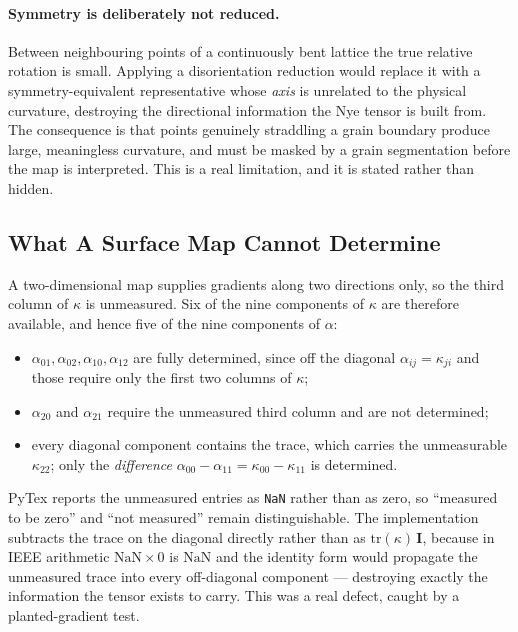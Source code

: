 \paragraph{Symmetry is deliberately not reduced.}
Between neighbouring points of a continuously bent lattice the true relative
rotation is small. Applying a disorientation reduction would replace it with a
symmetry-equivalent representative whose \emph{axis} is unrelated to the
physical curvature, destroying the directional information the Nye tensor is
built from. The consequence is that points genuinely straddling a grain boundary
produce large, meaningless curvature, and must be masked by a grain segmentation
before the map is interpreted. This is a real limitation, and it is stated
rather than hidden.

\subsection{What A Surface Map Cannot Determine}

A two-dimensional map supplies gradients along two directions only, so the third
column of $\kappa$ is unmeasured. Six of the nine components of $\kappa$ are
therefore available, and hence five of the nine components of $\alpha$:

\begin{itemize}
  \item $\alpha_{01}, \alpha_{02}, \alpha_{10}, \alpha_{12}$ are fully
        determined, since off the diagonal $\alpha_{ij} = \kappa_{ji}$ and those
        require only the first two columns of $\kappa$;
  \item $\alpha_{20}$ and $\alpha_{21}$ require the unmeasured third column and
        are not determined;
  \item every diagonal component contains the trace, which carries the
        unmeasurable $\kappa_{22}$; only the \emph{difference}
        $\alpha_{00} - \alpha_{11} = \kappa_{00} - \kappa_{11}$ is determined.
\end{itemize}

PyTex reports the unmeasured entries as \texttt{NaN} rather than as zero, so
``measured to be zero'' and ``not measured'' remain distinguishable. The
implementation subtracts the trace on the diagonal directly rather than as
$\mathrm{tr}(\kappa)\,\mathbf{I}$, because in IEEE arithmetic
$\mathrm{NaN} \times 0$ is $\mathrm{NaN}$ and the identity form would propagate
the unmeasured trace into every off-diagonal component --- destroying exactly the
information the tensor exists to carry. This was a real defect, caught by a
planted-gradient test.

